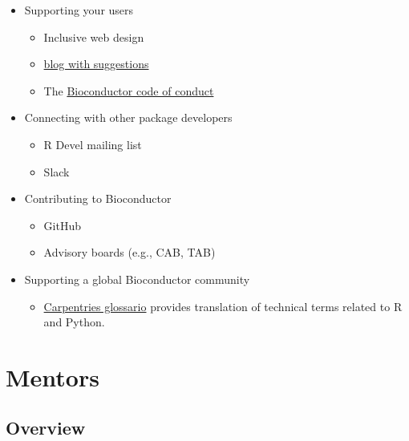 \documentclass[
]{book}
\providecommand{\tightlist}{%
  \setlength{\itemsep}{0pt}\setlength{\parskip}{0pt}}
\begin{document}
\begin{itemize}
\tightlist
\item
  Supporting your users

  \begin{itemize}
  \tightlist
  \item
    Inclusive web design
  \item
    \href{https://uxdesign.cc/designing-for-all-a-detailed-guide-to-designing-for-disabilities-aa92f5dcc49b}{blog with suggestions}
  \item
    The \href{http://www.bioconductor.org/about/code-of-conduct/}{Bioconductor code of conduct}
  \end{itemize}
\item
  Connecting with other package developers

  \begin{itemize}
  \tightlist
  \item
    R Devel mailing list
  \item
    Slack
  \end{itemize}
\item
  Contributing to Bioconductor

  \begin{itemize}
  \tightlist
  \item
    GitHub
  \item
    Advisory boards (e.g., CAB, TAB)
  \end{itemize}
\item
  Supporting a global Bioconductor community

  \begin{itemize}
  \tightlist
  \item
    \href{https://carpentries.github.io/glosario/}{Carpentries glossario} provides translation of technical terms related to R and Python.
  \end{itemize}
\end{itemize}

\hypertarget{part-mentors}{%
\part{Mentors}\label{part-mentors}}

\hypertarget{mentors-overview}{%
\chapter*{Overview}\label{mentors-overview}}
\end{document}
